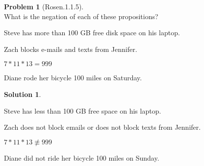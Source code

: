 \documentclass{article}
\theoremstyle{definition}
\newtheorem*{problem}{Problem}
\newtheorem*{solution}{Solution}
\begin{document}
\begin{problem}[Rosen.1.1.5]\ \\
What is the negation of each of these propositions?
\begin{compactenum}
\renewcommand{\theenumi}{\alph{enumi}}
\item Steve has more than 100 GB free disk space on his laptop.
\item Zach blocks e-mails and texts from Jennifer.
\item $7*11*13 = 999$
\item Diane rode her bicycle 100 miles on Saturday.
\end{compactenum}
\end{problem}

\begin{solution}\ \\
\begin{compactenum}
\renewcommand{\theenumi}{\alph{enumi}}
\item Steve has less than 100 GB free space on his laptop.
\item Zach does not block emails or does not block texts from Jennifer.
\item $7*11*13 \not\equiv 999$
\item Diane did not ride her bicycle 100 miles on Sunday.
\end{compactenum}
\end{solution}
\end{document}

